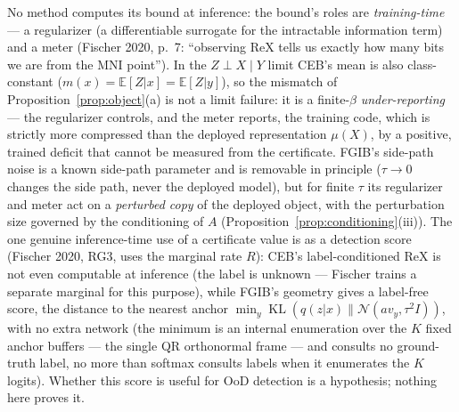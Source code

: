 \begin{remark}\label{rem:training-role}
No method computes its bound at inference: the bound's roles are \emph{training-time}
--- a regularizer (a differentiable surrogate for the intractable information term) and
a meter (Fischer 2020, p.~7: ``observing ReX tells us exactly how many bits we are from
the MNI point''). In the $Z \perp X \mid Y$ limit CEB's mean is also class-constant
($m(x) = \mathbb{E}[Z|x] = \mathbb{E}[Z|y]$), so the mismatch of
Proposition~\ref{prop:object}(a) is not a limit failure: it is a finite-$\beta$
\emph{under-reporting} --- the regularizer controls, and the meter reports, the training
code, which is strictly more compressed than the deployed representation $\mu(X)$, by a
positive, trained deficit that cannot be measured from the certificate. FGIB's
side-path noise is a known side-path parameter and is removable in principle
($\tau \to 0$ changes the side path, never the deployed model), but for finite
$\tau$ its regularizer and meter act on a \emph{perturbed copy} of the deployed
object, with the perturbation size governed by the conditioning of $A$
(Proposition~\ref{prop:conditioning}(iii)).
The one genuine inference-time use of a certificate value is as a detection score
(Fischer 2020, RG3, uses the marginal rate $R$): CEB's label-conditioned
$\mathrm{ReX}$ is not even computable at inference (the label is unknown --- Fischer
trains a separate marginal for this purpose), while FGIB's geometry gives a label-free
score, the distance to the nearest anchor
$\min_y \operatorname{KL}(q(z|x)\|\mathcal{N}(a v_y, \tau^2 I))$, with no extra network
(the minimum is an internal enumeration over the $K$ fixed anchor buffers --- the single
QR orthonormal frame --- and consults no ground-truth label, no more than softmax
consults labels when it enumerates the $K$ logits). Whether this score is useful for OoD
detection is a hypothesis; nothing here proves it.
\end{remark}

